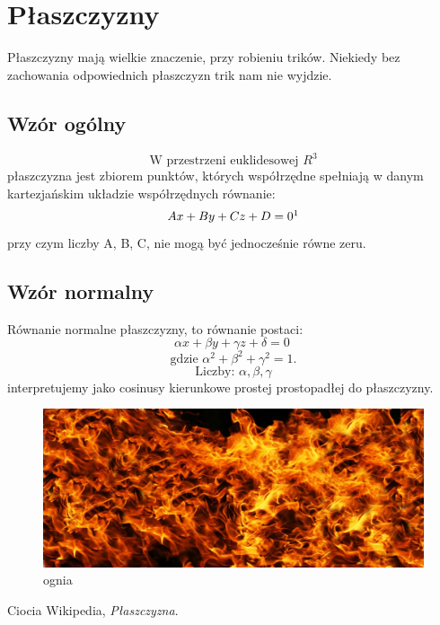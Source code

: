 \documentclass[15pt,a4paper]{article}
\begin{document}
\section{Płaszczyzny}
Płaszczyzny mają wielkie znaczenie, przy robieniu trików. Niekiedy bez zachowania odpowiednich płaszczyzn trik nam nie wyjdzie.
 \subsection{Wzór ogólny}
 \begin{equation}
 \textrm{W przestrzeni euklidesowej }
 R^3
 \end{equation} płaszczyzna jest zbiorem punktów, których współrzędne spełniają w danym kartezjańskim układzie współrzędnych równanie:
 \begin{equation}
 Ax+By+Cz+D=0\footnote{z postaci ogólnej wzoru można przejść do postaci normalnej}
 \end{equation}
przy czym liczby A, B, C, nie mogą być jednocześnie równe zeru.\
 \subsection{Wzór normalny}
 Równanie normalne płaszczyzny, to równanie postaci:
 \begin{equation}
 \alpha x + \beta y + \gamma z + \delta = 0\
 \end{equation} 
\begin{equation}
 \textrm{gdzie }
 \alpha^2 + \beta^2 + \gamma^2 = 1.
 \end{equation} 
 \begin{equation}\textrm{Liczby: } \alpha, \beta, \gamma 
 \end{equation}
  interpretujemy jako cosinusy kierunkowe prostej prostopadłej do płaszczyzny.

\begin{figure}
\centering
\graphicspath{{/projektLaTeXmkotewicz.s-/}}
\includegraphics[scale=0.1,natwidth=1360,natheight=556]{ognia.jpg}
\caption{ognia}\label{rys:logo:jeden}
\end{figure}

\begin{thebibliography}{9}
  Ciocia Wikipedia,
  \emph{Płaszczyzna}.
\end{thebibliography}
\end{document}
